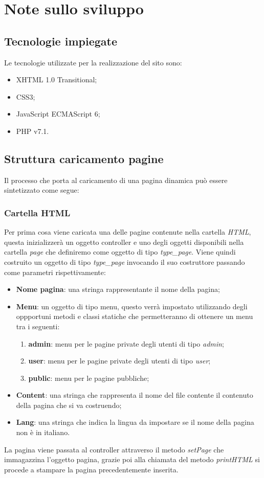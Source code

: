 \documentclass[a4paper,12pt]{article}
\begin{document}
\section{Note sullo sviluppo}
\subsection{Tecnologie impiegate}
Le tecnologie utilizzate per la realizzazione del sito sono:
\begin{itemize}
	\item XHTML 1.0 Transitional;
	\item CSS3;
	\item JavaScript ECMAScript 6;
	\item PHP v7.1.
\end{itemize}
\subsection{Struttura caricamento pagine}
Il processo che porta al caricamento di una pagina dinamica può essere sintetizzato come segue:

\subsubsection{Cartella HTML}
Per prima cosa viene caricata una delle pagine contenute nella cartella \textit{HTML}, questa inizializzerà un oggetto controller e uno degli oggetti disponibili nella cartella \textit{page} che definiremo come oggetto di tipo \textit{type\_page}.
Viene quindi costruito un oggetto di tipo \textit{type\_page} invocando il suo costruttore passando come parametri rispettivamente:
	\begin{itemize}
		\item \textbf{Nome pagina}: una stringa rappresentante il nome della pagina;
		\item \textbf{Menu}: un oggetto di tipo menu, questo verrà impostato utilizzando degli oppportuni metodi e classi statiche che permetteranno di ottenere un menu tra i seguenti:
		\begin{enumerate}
			\item \textbf{admin}: menu per le pagine private degli utenti di tipo \textit{admin};
			\item \textbf{user}: menu per le pagine private degli utenti di tipo \textit{user};
			\item \textbf{public}: menu per le pagine pubbliche;
		\end{enumerate}
		\item \textbf{Content}: una stringa che rappresenta il nome del file contente il contenuto della pagina che si va costruendo;
		\item \textbf{Lang}: una stringa che indica la lingua da impostare se il nome della pagina non è in italiano.
	\end{itemize}
La pagina viene passata al controller attraverso il metodo \textit{setPage} che immagazzina l'oggetto pagina, grazie poi alla chiamata del metodo \textit{printHTML} si procede a stampare la pagina precedentemente inserita.
\end{document}
